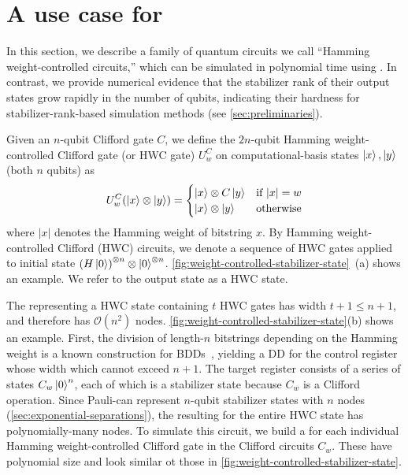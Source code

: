 \section{A use case for \limdds}
\label{sec:very-hard-states}

\newcommand\dicke[2]{\ket{D^{#1}_{#2}}}

In this section, we describe a family of quantum circuits we call ``Hamming weight-controlled circuits,'' which can be simulated in polynomial time using \limdds.
In contrast, we provide numerical evidence that the stabilizer rank of their output states grow rapidly in the number of qubits, indicating their hardness for stabilizer-rank-based simulation methods (see \autoref{sec:preliminaries}).

Given an $n$-qubit Clifford gate $C$, we define the $2n$-qubit Hamming weight-controlled Clifford gate (or HWC gate) $U_w^C$ on computational-basis states $\ket{x}, \ket{y}$ (both $n$ qubits) as
\begin{align}
    \label{eq:hamming-weight-control-gate}
    U^C_w(\ket{x} \otimes \ket{y}) = \begin{cases}
        \ket{x} \otimes C\ket{y} & \text{if } |x|=w \\
        \ket{x} \otimes \ket{y} & \text{otherwise}
	\end{cases}
\end{align}
where $|x|$ denotes the Hamming weight of bitstring $x$.
By Hamming weight-controlled Clifford (HWC) circuits,
we denote a sequence of HWC gates applied to initial state $\left(H\ket{0}\right)^{\otimes n}\otimes \ket{0}^{\otimes n}$.
\autoref{fig:weight-controlled-stabilizer-state}~(a) shows an example.
We refer to the output state as a HWC state.


The \limdd representing a HWC state containing $t$ HWC gates has width $t+1\leq n+1$, and therefore has $\mathcal O(n^2)$ nodes.
\autoref{fig:weight-controlled-stabilizer-state}(b) shows an example.
First, the division of length-$n$ bitstrings depending on the Hamming weight is a known construction for BDDs~\cite{bryant86}, yielding a DD for the control register whose width which cannot exceed $n+1$. %
The target register consists of a series of states $C_w \ket{0}^n$, each of which is a stabilizer state because $C_w$ is a Clifford operation.
Since Pauli-\limdds can represent $n$-qubit stabilizer states with $n$ nodes (\autoref{sec:exponential-separations}), the resulting \limdd for the entire HWC state has polynomially-many nodes.
To simulate this circuit, we build a \limdd for each individual Hamming weight-controlled Clifford gate in the Clifford circuits $C_w$.
These \limdds have polynomial size and look similar ot those in \autoref{fig:weight-controlled-stabilizer-state}.


